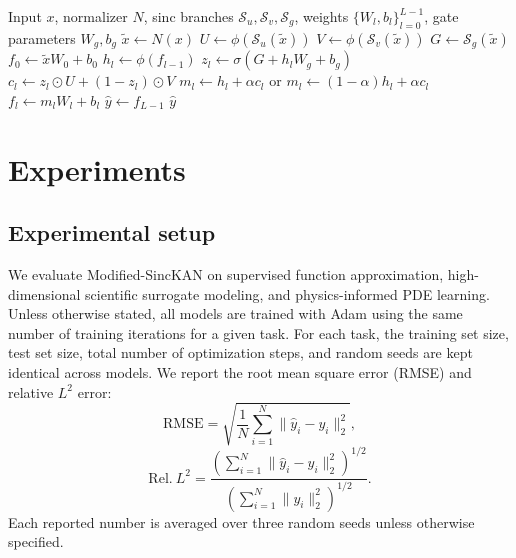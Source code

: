 \documentclass[preprint,12pt]{elsarticle}
\begin{document}
\begin{algorithm}[t]
\caption{Forward pass of Modified-SincKAN}
\label{alg:modified_sinckan}
\begin{algorithmic}[1]
\REQUIRE Input \(x\), normalizer \(N\), sinc branches \(\mathcal{S}_u,\mathcal{S}_v,\mathcal{S}_g\), weights \(\{W_l,b_l\}_{l=0}^{L-1}\), gate parameters \(W_g,b_g\)
\STATE \(\tilde{x} \leftarrow N(x)\)
\STATE \(U \leftarrow \phi(\mathcal{S}_u(\tilde{x}))\)
\STATE \(V \leftarrow \phi(\mathcal{S}_v(\tilde{x}))\)
\STATE \(G \leftarrow \mathcal{S}_g(\tilde{x})\)
\STATE \(f_0 \leftarrow \tilde{x}W_0+b_0\)
  \STATE \(h_l \leftarrow \phi(f_{l-1})\)
  \STATE \(z_l \leftarrow \sigma(G+h_lW_g+b_g)\)
  \STATE \(c_l \leftarrow z_l\odot U + (1-z_l)\odot V\)
  \STATE \(m_l \leftarrow h_l+\alpha c_l\) or \(m_l \leftarrow (1-\alpha)h_l+\alpha c_l\)
  \STATE \(f_l \leftarrow m_lW_l+b_l\)
\ENDFOR
\STATE \(\hat{y}\leftarrow f_{L-1}\)
\RETURN \(\hat{y}\)
\end{algorithmic}
\end{algorithm}

\section{Experiments}

\subsection{Experimental setup}

We evaluate Modified-SincKAN on supervised function approximation, high-dimensional scientific surrogate modeling, and physics-informed PDE learning. Unless otherwise stated, all models are trained with Adam using the same number of training iterations for a given task. For each task, the training set size, test set size, total number of optimization steps, and random seeds are kept identical across models. We report the root mean square error (RMSE) and relative \(L^2\) error:
\begin{equation}
  \mathrm{RMSE}
  =
  \sqrt{\frac{1}{N}\sum_{i=1}^{N}
  \|\hat{y}_i-y_i\|_2^2},
\end{equation}
\begin{equation}
  \mathrm{Rel.}~L^2
  =
  \frac{
  \left(\sum_{i=1}^{N}\|\hat{y}_i-y_i\|_2^2\right)^{1/2}
  }{
  \left(\sum_{i=1}^{N}\|y_i\|_2^2\right)^{1/2}
  }.
\end{equation}
Each reported number is averaged over three random seeds unless otherwise specified.
\end{document}
